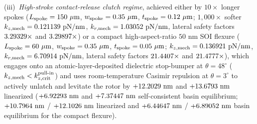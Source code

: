 (iii)~\emph{High-stroke contact-release clutch regime}, achieved either by $10\times$ longer spokes ($L_{\rm spoke} = \NatureRotCeightCompactNtwoLateralStabilitySoftClutchLSpokeUm{}\ \mu\text{m}$, $w_{\rm spoke} = \NatureRotCeightCompactNtwoLateralStabilitySoftClutchWSpokeUm{}\ \mu\text{m}$, $t_{\rm spoke} = \NatureRotCeightCompactNtwoLateralStabilitySoftClutchTSpokeUm{}\ \mu\text{m}$; $1,000\times$ softer $k_{z,\rm mech} = 0.121139{}\text{ pN/nm}$, $k_{r,\rm mech} = 1.03052{}\text{ pN/nm}$, lateral safety factors $3.29329{}\times$ and $3.29897{}\times$) or a compact high-aspect-ratio $50\text{ nm}$ SOI flexure ($L_{\rm spoke} = \NatureRotCeightCompactNtwoLateralStabilityCompactClutchLSpokeUm{}\ \mu\text{m}$, $w_{\rm spoke} = \NatureRotCeightCompactNtwoLateralStabilityCompactClutchWSpokeUm{}\ \mu\text{m}$, $t_{\rm spoke} = \NatureRotCeightCompactNtwoLateralStabilityCompactClutchTSpokeUm{}\ \mu\text{m}$; $k_{z,\rm mech} = 0.136921{}\text{ pN/nm}$, $k_{r,\rm mech} = 6.70914{}\text{ pN/nm}$, lateral safety factors $21.4407{}\times$ and $21.4777{}\times$), which engages onto an atomic-layer-deposited dielectric stop-bumper at $\theta=48^\circ$ ($k_{z,\rm mech} < k_{z,\rm crit}^{\rm pull\text{-}in}$) and uses room-temperature Casimir repulsion at $\theta=3^\circ$ to actively unlatch and levitate the rotor by $+12.2029{}\text{ nm}$ and $+13.6793{}\text{ nm}$ linearized ($+6.92293{}\text{ nm}$ and $+7.37447{}\text{ nm}$ self-consistent basin equilibrium; $+10.7964{}\text{ nm}$ / $+12.1026{}\text{ nm}$ linearized and $+6.44647{}\text{ nm}$ / $+6.89052{}\text{ nm}$ basin equilibrium for the compact flexure).

